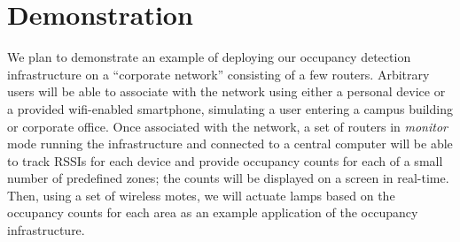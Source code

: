 \section{Demonstration}
We plan to demonstrate an example of deploying our occupancy detection infrastructure on a ``corporate network'' consisting of a few routers. Arbitrary users will be able to associate with the network using either a personal device or a provided wifi-enabled smartphone, simulating a user entering a campus building or corporate office. Once associated with the network, a set of routers in \emph{monitor} mode running the infrastructure and connected to a central computer will be able to track RSSIs for each device and provide occupancy counts for each of a small number of predefined zones; the counts will be displayed on a screen in real-time. Then, using a set of wireless motes, we will actuate lamps based on the occupancy counts for each area as an example application of the occupancy infrastructure.